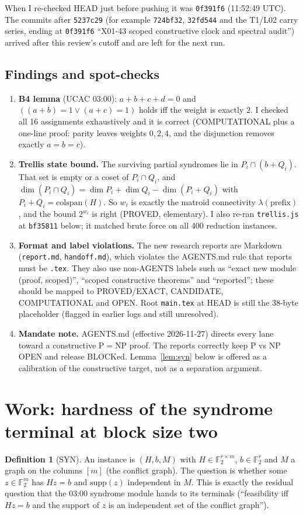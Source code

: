 \documentclass[11pt]{article}
\theoremstyle{definition}
\newtheorem{definition}{Definition}
\newcommand{\Ft}{\mathbb{F}_2}
\begin{document}
When I re-checked HEAD just before pushing it was \texttt{0f391f6} (11:52:49 UTC). The commits after \texttt{5237c29} (for example \texttt{724bf32}, \texttt{32fd544} and the T1/L02 carry series, ending at \texttt{0f391f6} ``X01-43 scoped constructive clock and spectral audit'') arrived after this review's cutoff and are left for the next run.
\subsection{Findings and spot-checks}
\begin{enumerate}
\item \textbf{B4 lemma} (UCAC 03:00): $a+b+c+d=0$ and $((a+b)=1 \lor (a+c)=1)$ holds iff the weight is exactly 2. I checked all 16 assignments exhaustively and it is correct (COMPUTATIONAL plus a one-line proof: parity leaves weights $0,2,4$, and the disjunction removes exactly $a=b=c$).
\item \textbf{Trellis state bound.} The surviving partial syndromes lie in $P_i\cap(b+Q_i)$. That set is empty or a coset of $P_i\cap Q_i$, and $\dim(P_i\cap Q_i)=\dim P_i+\dim Q_i-\dim(P_i+Q_i)$ with $P_i+Q_i=\mathrm{colspan}(H)$. So $w_i$ is exactly the matroid connectivity $\lambda(\text{prefix})$, and the bound $2^{w_i}$ is right (PROVED, elementary). I also re-ran \texttt{trellis.js} at \texttt{bf35811} below; it matched brute force on all 400 reduction instances.
\item \textbf{Format and label violations.} The new research reports are Markdown (\texttt{report.md}, \texttt{handoff.md}), which violates the AGENTS.md rule that reports must be \texttt{.tex}. They also use non-AGENTS labels such as ``exact new module (proof, scoped)'', ``scoped constructive theorems'' and ``reported''; these should be mapped to PROVED/EXACT, CANDIDATE, COMPUTATIONAL and OPEN. Root \texttt{main.tex} at HEAD is still the 38-byte placeholder  (flagged in earlier logs and still unresolved).
\item \textbf{Mandate note.} AGENTS.md (effective 2026-11-27) directs every lane toward a constructive P$=$NP proof. The reports correctly keep P vs NP OPEN and release BLOCKed. Lemma~\ref{lem:syn} below is offered as a calibration of the constructive target, not as a separation argument.
\end{enumerate}

\section{Work: hardness of the syndrome terminal at block size two}
\begin{definition}[SYN]
An instance is $(H,b,M)$ with $H\in\Ft^{r\times m}$, $b\in\Ft^r$ and $M$ a graph on the columns $[m]$ (the conflict graph). The question is whether some $z\in\Ft^m$ has $Hz=b$ and $\mathrm{supp}(z)$ independent in $M$. This is exactly the residual question that the 03:00 syndrome module hands to its terminals (``feasibility iff $Hz=b$ and the support of $z$ is an independent set of the conflict graph'').
\end{definition}
\end{document}
